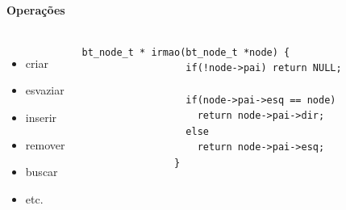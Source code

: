 \begin{frame}[fragile,label=notas]
	\framesubtitle{Operações}

	\begin{columns}
			\begin{itemize}
				\item criar
				\item esvaziar
				\item inserir
				\item remover
				\item buscar
				\item etc.
			\end{itemize}
			\vfill\pause
			\begin{lstlisting}[title=Exemplo]
				bt_node_t * irmao(bt_node_t *node) {
				  if(!node->pai) return NULL;

				  if(node->pai->esq == node)
				    return node->pai->dir;
				  else
				    return node->pai->esq;
				}
			\end{lstlisting}
	\end{columns}
\end{frame}






